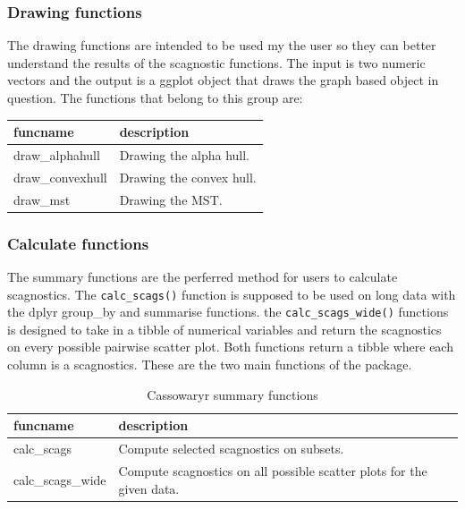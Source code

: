 \hypertarget{drawing-functions}{%
\subsubsection{Drawing functions}\label{drawing-functions}}

The drawing functions are intended to be used my the user so they can
better understand the results of the scagnostic functions. The input is
two numeric vectors and the output is a ggplot object that draws the
graph based object in question. The functions that belong to this group
are:

\begin{Schunk}

\begin{tabular}{l|l}
\hline
funcname & description\\
\hline
draw\_alphahull & Drawing the alpha hull.\\
\hline
draw\_convexhull & Drawing the convex hull.\\
\hline
draw\_mst & Drawing the MST.\\
\hline
\end{tabular}

\end{Schunk}

\hypertarget{calculate-functions}{%
\subsubsection{Calculate functions}\label{calculate-functions}}

The summary functions are the perferred method for users to calculate
scagnostics. The \texttt{calc\_scags()} function is supposed to be used
on long data with the dplyr group\_by and summarise functions. the
\texttt{calc\_scags\_wide()} functions is designed to take in a tibble
of numerical variables and return the scagnostics on every possible
pairwise scatter plot. Both functions return a tibble where each column
is a scagnostics. These are the two main functions of the package.

\begin{Schunk}
\begin{table}

\caption{\label{tab:dsumfuncs-tb-pdf}Cassowaryr summary functions}
\centering
\begin{tabular}[t]{>{\raggedright\arraybackslash}p{2cm}l}
\toprule
funcname & description\\
\midrule
calc\_scags & Compute selected scagnostics on subsets.\\
calc\_scags\_wide & Compute scagnostics on all possible scatter plots for the given data.\\
\bottomrule
\end{tabular}
\end{table}

\end{Schunk}

